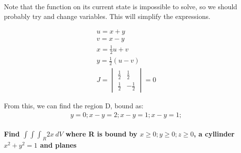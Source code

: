 \documentclass[11pt,fleqn]{book} %
\begin{document}
Note that the function on its current state is impossible to solve, so we should probably try and change variables. This will simplify the expressions.

\begin{gather}
    u = x+y \\
    v = x-y \\
    x = \frac{1}{2} u+v \\
    y = \frac{1}{2} (u-v)\\
    J = \begin{vmatrix}
    \frac{1}{2} & \frac{1}{2} \\
    \frac{1}{2} & -\frac{1}{2} 
    \end{vmatrix}=0
\end{gather}

From this, we can find the region D, bound as:
\begin{gather}
    y=0 ; x-y= 2 ; x-y =1 ; x-y = 1 ; 
\end{gather}

\paragraph*{Find ${\int\int\int}_R 2x \ dV$ where R is bound by $x \geq 0 ; y \geq 0 ; z \geq 0$,
a cyllinder $x^2 + y^2 = 1$ and planes }




\end{document}
